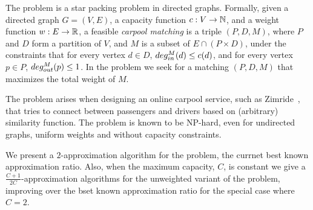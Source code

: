 The \textsc{\CARPOOL{}} problem is a star packing problem in
directed graphs.
Formally, given a directed graph $G = (V, E)$,
a capacity function $ c: V \rightarrow \mathbb{N} $,
and a weight function $w : E \rightarrow \mathbb{R} $,
a feasible \emph{carpool matching} is a triple 
$(P, D, M)$, where $P$ and $D$ form a partition of $V$, 
and $M$ is a subset of $E \cap (P \times D)$,
under the constraints that for every vertex $d \in D$, 
$deg^M_{in}(d) \leq c(d)$, 
and for every vertex $p \in P$, $deg^M_{out}(p) \leq 1$.
In the \textsc{\CARPOOL{}} 
problem we seek for a matching $(P, D, M)$ that maximizes the total weight of $M$.

The problem arises when designing an online carpool service, 
such as Zimride~\cite{zimride}, 
that tries to connect between passengers and drivers based on (arbitrary) similarity function.
The problem is known to be NP-hard, 
even for undirected graphs, uniform weights and without capacity constraints.

We present a $2$-approximation algorithm for the problem,
the currnet best known approximation ratio.
Also, when the maximum capacity, $C$, is constant we give a
$\frac{C + 1}{2C}$-approximation algorithms for the 
unweighted variant of the problem, 
improving over the bset known approximation ratio for the special case where $C = 2$.
